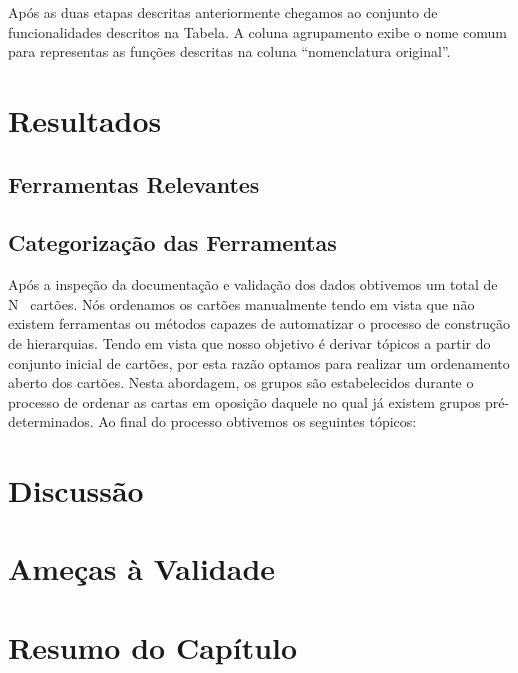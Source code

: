 Após as duas etapas descritas anteriormente chegamos ao conjunto de
funcionalidades descritos na Tabela. A coluna agrupamento exibe o nome comum
para representas as funções descritas na coluna ``nomenclatura original''.

\section{Resultados}
\label{sec:resultados}

\subsection{Ferramentas Relevantes}
\label{subsec:resultados_ferramentas_relevantes}


\subsection{Categorização das Ferramentas}
\label{subsec:categorizacao_ferramentas}

Após a inspeção da documentação e validação dos dados obtivemos um total de
N~ cartões.  Nós
ordenamos os cartões manualmente tendo em vista que não existem ferramentas ou
métodos capazes de automatizar o processo de construção de hierarquias. Tendo em
vista que nosso objetivo é derivar tópicos a partir do conjunto inicial de
cartões, por esta razão optamos para realizar um ordenamento aberto dos cartões.
Nesta abordagem, os grupos são estabelecidos durante o processo de ordenar as
cartas em oposição daquele no qual já existem grupos pré-determinados. Ao final
do processo obtivemos os seguintes tópicos:

\section{Discussão}
\label{sec:discussao}

\section{Ameças à Validade}
\label{sec:ameacas_a_validade}


\section{Resumo do Capítulo}
\label{sec:resumo_do_capitulo}